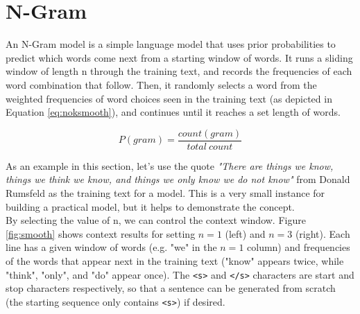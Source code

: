\documentclass[11pt]{article}
\begin{document}
\section{N-Gram}
\label{sec:eval}

An N-Gram model is a simple language model that uses prior probabilities to predict which words come next from a starting window of words.  It runs a sliding window of length n through the training text, and records the frequencies of each word combination that follow.  Then, it randomly selects a word from the weighted frequencies of word choices seen in the training text (as depicted in Equation \ref{eq:noksmooth}), and continues until it reaches a set length of words.

\begin{equation}
\label{eq:noksmooth}
P(gram) = \frac{count(gram) }{total~count}
\end{equation} \vspace{0.1em}

As an example in this section, let's use the quote \textit{"There are things we know, things we think we know, and things we only know we do not know"} from Donald Rumsfeld as the training text for a model.  This is a very small instance for building a practical model, but it helps to demonstrate the concept.\\

By selecting the value of n, we can control the context window.  Figure \ref{fig:smooth} shows context results for setting $n=1$ (left) and $n=3$ (right).  Each line has a given window of words (e.g. "we" in the $n=1$ column) and frequencies of the words that appear next in the training text ("know" appears twice, while "think", "only", and "do" appear once).  The \texttt{<s>} and \texttt{</s>} characters are start and stop characters respectively, so that a sentence can be generated from scratch (the starting sequence only contains \texttt{<s>}) if desired.

\end{document}
